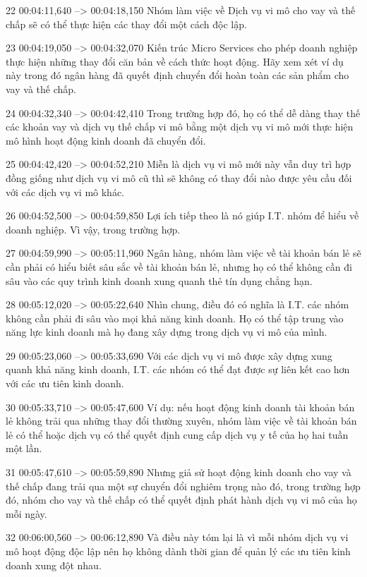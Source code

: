 22
00:04:11,640 --> 00:04:18,150
Nhóm làm việc về Dịch vụ vi mô cho vay và thế chấp sẽ có thể thực hiện các thay đổi một cách độc lập.

23
00:04:19,050 --> 00:04:32,070
Kiến trúc Micro Services cho phép doanh nghiệp thực hiện những thay đổi căn bản về cách thức hoạt động.  Hãy xem xét ví dụ này trong đó ngân hàng đã quyết định chuyển đổi hoàn toàn các sản phẩm cho vay và thế chấp.

24
00:04:32,340 --> 00:04:42,410
Trong trường hợp đó, họ có thể dễ dàng thay thế các khoản vay và dịch vụ thế chấp vi mô bằng một dịch vụ vi mô mới thực hiện mô hình hoạt động kinh doanh đã chuyển đổi.

25
00:04:42,420 --> 00:04:52,210
Miễn là dịch vụ vi mô mới này vẫn duy trì hợp đồng giống như dịch vụ vi mô cũ thì sẽ không có thay đổi nào được yêu cầu đối với các dịch vụ vi mô khác.

26
00:04:52,500 --> 00:04:59,850
Lợi ích tiếp theo là nó giúp I.T.  nhóm để hiểu về doanh nghiệp.  Vì vậy, trong trường hợp.

27
00:04:59,990 --> 00:05:11,960
Ngân hàng, nhóm làm việc về tài khoản bán lẻ sẽ cần phải có hiểu biết sâu sắc về tài khoản bán lẻ, nhưng họ có thể không cần đi sâu vào các quy trình kinh doanh xung quanh thẻ tín dụng chẳng hạn.

28
00:05:12,020 --> 00:05:22,640
Nhìn chung, điều đó có nghĩa là I.T.  các nhóm không cần phải đi sâu vào mọi khả năng kinh doanh.  Họ có thể tập trung vào năng lực kinh doanh mà họ đang xây dựng trong dịch vụ vi mô của mình.

29
00:05:23,060 --> 00:05:33,690
Với các dịch vụ vi mô được xây dựng xung quanh khả năng kinh doanh, I.T.  các nhóm có thể đạt được sự liên kết cao hơn với các ưu tiên kinh doanh.

30
00:05:33,710 --> 00:05:47,600
Ví dụ: nếu hoạt động kinh doanh tài khoản bán lẻ không trải qua những thay đổi thường xuyên, nhóm làm việc về tài khoản bán lẻ có thể hoặc dịch vụ có thể quyết định cung cấp dịch vụ y tế của họ hai tuần một lần.

31
00:05:47,610 --> 00:05:59,890
Nhưng giả sử hoạt động kinh doanh cho vay và thế chấp đang trải qua một sự chuyển đổi nghiêm trọng nào đó, trong trường hợp đó, nhóm cho vay và thế chấp có thể quyết định phát hành dịch vụ vi mô của họ mỗi ngày.

32
00:06:00,560 --> 00:06:12,890
Và điều này tóm lại là vì mỗi nhóm dịch vụ vi mô hoạt động độc lập nên họ không dành thời gian để quản lý các ưu tiên kinh doanh xung đột nhau.


